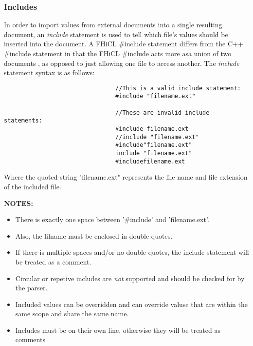 \documentclass{article}
\begin{document}
                \subsubsection{Includes}
                        In order to import values from external documents into a single resulting document,
                        an \emph{include} statement is used to tell which file's values should be inserted into the document.
                        A FHiCL \#include statement differs from the C++ \#include statement 
                        in that the FHiCL \#include acts 
                        more asa union of two documents
                        , as opposed to just allowing one file to access another.
                        The \emph{include} statement syntax is as follows:
                        \begin{verbatim}
                                //This is a valid include statement:
                                #include "filename.ext"
                                
                                //These are invalid include statements:
                                #include filename.ext
                                //include "filename.ext"
                                #include"filename.ext"
                                include "filename.ext"
                                #includefilename.ext
                        \end{verbatim}
                        \vspace{1mm}
                        \par
                        Where the quoted string "filename.ext" represents the file name and file extension of the included file.
                        \vspace{1mm}
                        \par
                        \bf NOTES: \rm 
                        \begin{itemize}
                           \item There is exactly one space between '\#include' and 'filename.ext'.
                           \item Also, the filname must be enclosed in double quotes.
                           \item If there is multiple spaces and/or no double quotes, 
                                 the include statement will be treated as a comment.
                           \item Circular or repetive includes are \emph{not} supported
                                 and should be checked for by the parser.
                           \item Included values can be overridden
                                 and can override valuse that are within the same scope
                                 and share the same name.
                           \item Includes must be on their own line, otherwise they will be treated as comments
                        \end{itemize}
\end{document}
